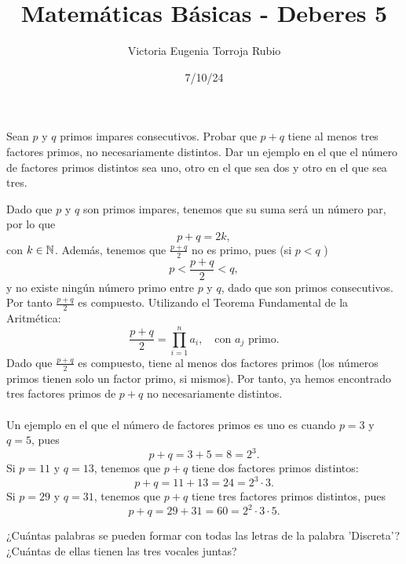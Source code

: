 \documentclass{article}
\begin{document}
\title{Matemáticas Básicas - Deberes 5}
\author{Victoria Eugenia Torroja Rubio}
\date{7/10/24}

\maketitle

\begin{ej}
Sean $\displaystyle p $ y $\displaystyle q $ primos impares consecutivos. Probar que $\displaystyle p + q $ tiene al menos tres factores primos, no necesariamente distintos. Dar un ejemplo en el que el número de factores primos distintos sea uno, otro en el que sea dos y otro en el que sea tres.
\end{ej}

\begin{sol}
Dado que $\displaystyle p $ y $\displaystyle q $ son primos impares, tenemos que su suma será un número par, por lo que 
\[p+q = 2k ,\]
con $\displaystyle k\in\mathbb{N} $. Además, tenemos que $\displaystyle \frac{p+q}{2} $ no es primo, pues (si $\displaystyle p < q $ )
\[ p < \frac{p+q}{2}<q,\]
y no existe ningún número primo entre $\displaystyle p $ y $\displaystyle q $, dado que son primos consecutivos. Por tanto $\displaystyle \frac{p+q}{2} $ es compuesto. Utilizando el Teorema Fundamental de la Aritmética:
\[\frac{p+q}{2}=\prod^{n}_{i=1}a_{i}, \quad \text{con $\displaystyle a_{j} $ primo} .\]
Dado que $\displaystyle \frac{p+q}{2} $ es compuesto, tiene al menos dos factores primos (los números primos tienen solo un factor primo, si mismos). Por tanto, ya hemos encontrado tres factores primos de $\displaystyle p+q $ no necesariamente distintos. \\ \\
Un ejemplo en el que el número de factores primos es uno es cuando $\displaystyle p = 3 $ y $\displaystyle q = 5 $, pues 
\[p+q = 3+5 = 8 = 2^{3} .\]
Si $\displaystyle p = 11 $ y $\displaystyle q = 13 $, tenemos que $\displaystyle p + q $ tiene dos factores primos distintos:
\[p+q=11+13=24 = 2^{3}\cdot3 .\]
Si $\displaystyle p = 29 $ y $\displaystyle q = 31 $, tenemos que $\displaystyle p+q $ tiene tres factores primos distintos, pues
\[p+q=29+31 =60 = 2^{2}\cdot3\cdot5 .\]
\end{sol}

\begin{ej}
¿Cuántas palabras se pueden formar con todas las letras de la palabra 'Discreta'? ¿Cuántas de ellas tienen las tres vocales juntas?
\end{ej}
\end{document}
